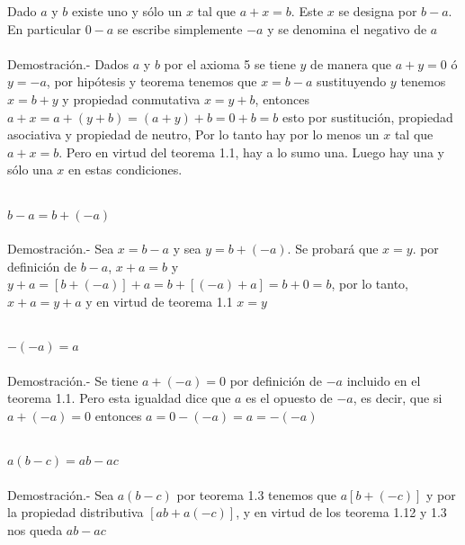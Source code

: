 \begin{teo}
Dado $a$ y $b$ existe uno y sólo un $x$ tal que $a+x=b$. Este $x$ se designa por $b-a$. En particular $0-a$ se escribe simplemente $-a$ y se denomina el negativo de $a$\\\\
Demostración.- \;
Dados $a$ y $b$ por el axioma 5 se tiene $y$ de manera que $a + y = 0$ ó $y=-a$, por hipótesis y teorema tenemos que $x=b-a$ sustituyendo $y$ tenemos $x=b+y$ y propiedad conmutativa $x=y+b$, entonces $a+x=a+(y+b)=(a+y)+b=0+b=b$ esto por sustitución, propiedad asociativa y propiedad de neutro, Por lo tanto hay por lo menos un $x$ tal que $a+x=b$. Pero en virtud del teorema 1.1, hay a lo sumo una. Luego hay una y sólo una $x$ en estas condiciones.\\\\ 
\end{teo}

\begin{teo}
$b-a=b+(-a)$\\\\
Demostración.- \; Sea $x=b-a$ y sea $y=b+(-a)$. Se probará que $x=y$. por definición de $b-a$, $x+a=b$ y $y+a=\left[ b+(-a)\right]+a=b+\left[ (-a)+a \right]=b+0=b$, por lo tanto, $x+a=y+a$ y en virtud de teorema 1.1 $x=y$\\\\
\end{teo}

\begin{teo}
$-(-a)=a$\\\\
Demostración.- \;
Se tiene $a+(-a)=0$ por definición de $-a$ incluido en el teorema 1.1. Pero esta igualdad dice que $a$ es el opuesto de $-a$, es decir, que si $a+(-a)=0$ entonces $a=0-(-a)=a=-(-a)$\\\\
\end{teo}

\begin{teo}
$a(b-c)=ab-ac$\\\\
Demostración.- \;
Sea $a(b-c)$ por teorema 1.3 tenemos que $a\left[ b+(-c)\right]$  y por la propiedad distributiva $\left[ ab + a(-c) \right]$, y en virtud de los teorema 1.12 y 1.3 nos queda $ ab - ac $ \\\\
\end{teo}

